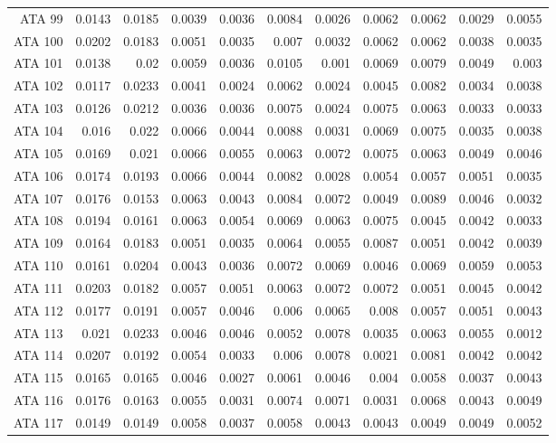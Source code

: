 \begin{landscape}
\begin{longtable}{rrrrrrrrrrr}
  ATA 99 & 0.0143 & 0.0185 & 0.0039 & 0.0036 & 0.0084 & 0.0026 & 0.0062 & 0.0062 & 0.0029 & 0.0055 \\ 
  ATA 100 & 0.0202 & 0.0183 & 0.0051 & 0.0035 & 0.007 & 0.0032 & 0.0062 & 0.0062 & 0.0038 & 0.0035 \\ 
  ATA 101 & 0.0138 & 0.02 & 0.0059 & 0.0036 & 0.0105 & 0.001 & 0.0069 & 0.0079 & 0.0049 & 0.003 \\ 
  ATA 102 & 0.0117 & 0.0233 & 0.0041 & 0.0024 & 0.0062 & 0.0024 & 0.0045 & 0.0082 & 0.0034 & 0.0038 \\ 
  ATA 103 & 0.0126 & 0.0212 & 0.0036 & 0.0036 & 0.0075 & 0.0024 & 0.0075 & 0.0063 & 0.0033 & 0.0033 \\ 
  ATA 104 & 0.016 & 0.022 & 0.0066 & 0.0044 & 0.0088 & 0.0031 & 0.0069 & 0.0075 & 0.0035 & 0.0038 \\ 
  ATA 105 & 0.0169 & 0.021 & 0.0066 & 0.0055 & 0.0063 & 0.0072 & 0.0075 & 0.0063 & 0.0049 & 0.0046 \\ 
  ATA 106 & 0.0174 & 0.0193 & 0.0066 & 0.0044 & 0.0082 & 0.0028 & 0.0054 & 0.0057 & 0.0051 & 0.0035 \\ 
  ATA 107 & 0.0176 & 0.0153 & 0.0063 & 0.0043 & 0.0084 & 0.0072 & 0.0049 & 0.0089 & 0.0046 & 0.0032 \\ 
  ATA 108 & 0.0194 & 0.0161 & 0.0063 & 0.0054 & 0.0069 & 0.0063 & 0.0075 & 0.0045 & 0.0042 & 0.0033 \\ 
  ATA 109 & 0.0164 & 0.0183 & 0.0051 & 0.0035 & 0.0064 & 0.0055 & 0.0087 & 0.0051 & 0.0042 & 0.0039 \\ 
  ATA 110 & 0.0161 & 0.0204 & 0.0043 & 0.0036 & 0.0072 & 0.0069 & 0.0046 & 0.0069 & 0.0059 & 0.0053 \\ 
  ATA 111 & 0.0203 & 0.0182 & 0.0057 & 0.0051 & 0.0063 & 0.0072 & 0.0072 & 0.0051 & 0.0045 & 0.0042 \\ 
  ATA 112 & 0.0177 & 0.0191 & 0.0057 & 0.0046 & 0.006 & 0.0065 & 0.008 & 0.0057 & 0.0051 & 0.0043 \\ 
  ATA 113 & 0.021 & 0.0233 & 0.0046 & 0.0046 & 0.0052 & 0.0078 & 0.0035 & 0.0063 & 0.0055 & 0.0012 \\ 
  ATA 114 & 0.0207 & 0.0192 & 0.0054 & 0.0033 & 0.006 & 0.0078 & 0.0021 & 0.0081 & 0.0042 & 0.0042 \\ 
  ATA 115 & 0.0165 & 0.0165 & 0.0046 & 0.0027 & 0.0061 & 0.0046 & 0.004 & 0.0058 & 0.0037 & 0.0043 \\ 
  ATA 116 & 0.0176 & 0.0163 & 0.0055 & 0.0031 & 0.0074 & 0.0071 & 0.0031 & 0.0068 & 0.0043 & 0.0049 \\ 
  ATA 117 & 0.0149 & 0.0149 & 0.0058 & 0.0037 & 0.0058 & 0.0043 & 0.0043 & 0.0049 & 0.0049 & 0.0052 \\ 

\end{longtable}
\end{landscape}
